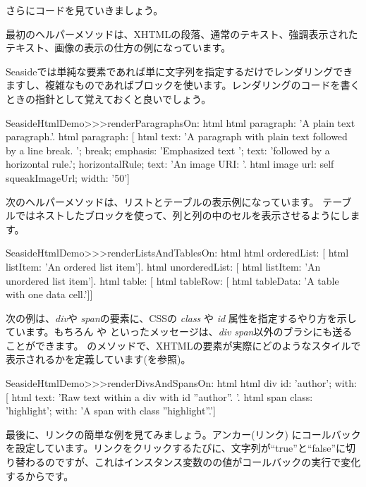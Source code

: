 \documentclass[a4paper,10pt,twoside]{book}
\begin{document}
さらにコードを見ていきましょう。

最初のヘルパーメソッドは、XHTMLの段落、通常のテキスト、強調表示されたテキスト、画像の表示の仕方の例になっています。

Seasideでは単純な要素であれば単に文字列を指定するだけでレンダリングできますし、複雑なものであればブロックを使います。レンダリングのコードを書くときの指針として覚えておくと良いでしょう。

\begin{code}{}
SeasideHtmlDemo>>>renderParagraphsOn: html 
	html paragraph: 'A plain text paragraph.'.
	html paragraph: [
		html
			text: 'A paragraph with plain text followed by a line break. ';
			break;
			emphasis: 'Emphasized text ';
			text: 'followed by a horizontal rule.';
			horizontalRule;
			text: 'An image URI: '.
		html image
			url: self squeakImageUrl;
			width: '50']
\end{code}

次のヘルパーメソッドは、リストとテーブルの表示例になっています。 テーブルではネストしたブロックを使って、列と列の中のセルを表示させるようにします。

\begin{code}{}
SeasideHtmlDemo>>>renderListsAndTablesOn: html 
	html orderedList: [
		html listItem: 'An ordered list item'].
	html unorderedList: [
		html listItem: 'An unordered list item'].
	html table: [
		html tableRow: [
			html tableData: 'A table with one data cell.']]
\end{code}

次の例は、\emph{div}や \emph{span}の要素に、CSSの \emph{class} や \emph{id} 属性を指定するやり方を示しています。もちろん
  や  といったメッセージは、\emph{div} \emph{span}以外のブラシにも送ることができます。
 のメソッドで、XHTMLの要素が実際にどのようなスタイルで表示されるかを定義しています(を参照)。

\begin{code}{}
SeasideHtmlDemo>>>renderDivsAndSpansOn: html 
	html div
		id: 'author';
		with: [
			html text: 'Raw text within a div with id ''author''. '.
			html span
				class: 'highlight';
				with: 'A span with class ''highlight''.']
\end{code}

最後に、リンクの簡単な例を見てみましょう。アンカー(リンク) にコールバックを設定しています。リンクをクリックするたびに、文字列が``true''と``false''に切り替わるのですが、これはインスタンス変数のの値がコールバックの実行で変化するからです。
\end{document}
